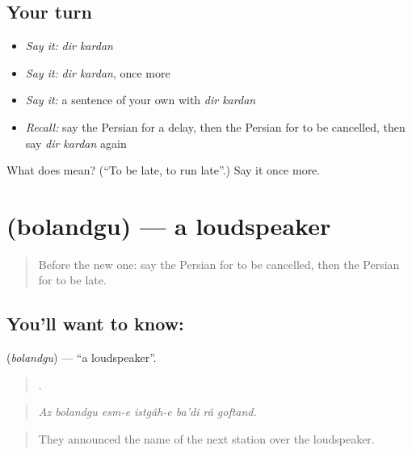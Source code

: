 \subsection*{Your turn}
\begin{itemize}
\raggedright
  \item \emph{Say it:} \emph{dir kardan}
  \item \emph{Say it:} \emph{dir kardan}, once more
  \item \emph{Say it:} a sentence of your own with \emph{dir kardan}
  \item \emph{Recall:} say the Persian for a delay, then the Persian for to be cancelled, then say \emph{dir kardan} again
\end{itemize}

\begin{tcolorbox}[breakable,colback=teal!4,colframe=teal!35!black,title={Before you move on}]
What does   mean? (\textquotedblleft{}To be late, to run late\textquotedblright{}.) Say it once more.
\end{tcolorbox}
\section[\texorpdfstring{\fa{بلندگو} (bolandgu)}{بلندگو (bolandgu)}]{ (bolandgu) — a loudspeaker}

\label{lesson:FA-C430-bolandgu}



\begin{quote}
Before the new one: say the Persian for to be cancelled, then the Persian for to be late.
\end{quote}

\subsection*{You'll want to know: }
\textbf{} (\emph{bolandgu}) — \textquotedblleft{}a loudspeaker\textquotedblright{}.

\begin{quote}
      .
\end{quote}

\begin{quote}
\emph{Az bolandgu esm-e istgâh-e ba'di râ goftand.}
\end{quote}

\begin{quote}
They announced the name of the next station over the loudspeaker.
\end{quote}

